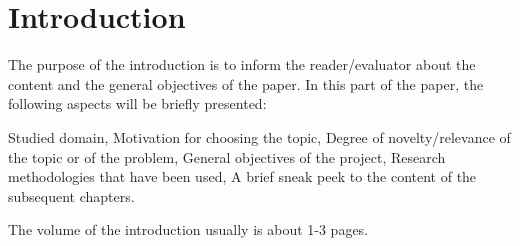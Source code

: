 \chapter*{Introduction}

\par The purpose of the introduction is to inform the reader/evaluator about the content and the general objectives of the paper. In this part of the paper, the following aspects will be briefly presented:
\begin{itemize}
    \hitem Studied domain,
    \hitem Motivation for choosing the topic,
    \hitem Degree of novelty/relevance of the topic or of the problem,
    \hitem General objectives of the project,
    \hitem Research methodologies that have been used,
    \hitem A brief sneak peek to the content of the subsequent chapters.
\end{itemize}
The volume of the introduction usually is about 1-3 pages.